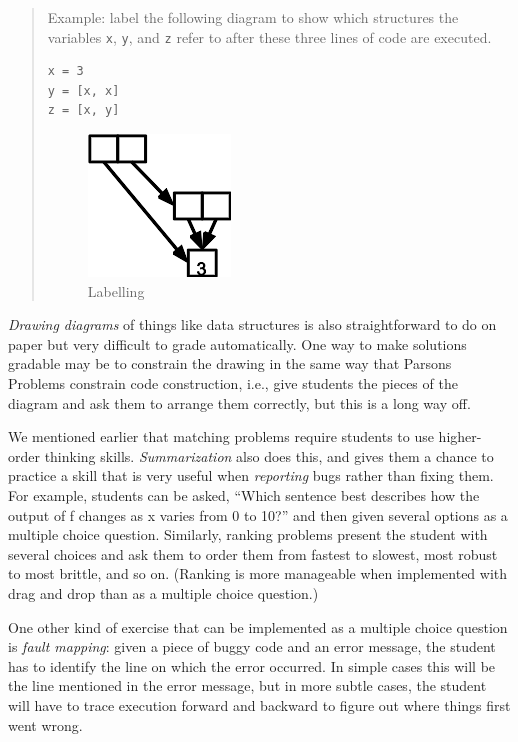 \documentclass[10pt,statementpaper]{memoir}
\begin{document}
\begin{quote}
Example: label the following diagram to show which structures the
variables \texttt{x}, \texttt{y}, and \texttt{z} refer to after these
three lines of code are executed.

\begin{verbatim}
x = 3
y = [x, x]
z = [x, y]
\end{verbatim}

\begin{figure}
\centering
\includegraphics{fig/label.png}
\caption{Labelling}
\end{figure}
\end{quote}

\emph{Drawing diagrams} of things like data structures is also
straightforward to do on paper but very difficult to grade
automatically. One way to make solutions gradable may be to constrain
the drawing in the same way that Parsons Problems constrain code
construction, i.e., give students the pieces of the diagram and ask them
to arrange them correctly, but this is a long way off.

We mentioned earlier that matching problems require students to use
higher-order thinking skills. \emph{Summarization} also does this, and
gives them a chance to practice a skill that is very useful when
\emph{reporting} bugs rather than fixing them. For example, students can
be asked, ``Which sentence best describes how the output of f changes as
x varies from 0 to 10?'' and then given several options as a multiple
choice question. Similarly, ranking problems present the student with
several choices and ask them to order them from fastest to slowest, most
robust to most brittle, and so on. (Ranking is more manageable when
implemented with drag and drop than as a multiple choice question.)

One other kind of exercise that can be implemented as a multiple choice
question is \emph{fault mapping}: given a piece of buggy code and an
error message, the student has to identify the line on which the error
occurred. In simple cases this will be the line mentioned in the error
message, but in more subtle cases, the student will have to trace
execution forward and backward to figure out where things first went
wrong.
\end{document}
